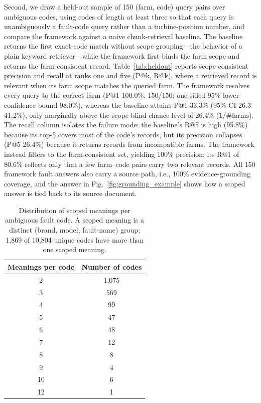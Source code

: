 \documentclass[lettersize,journal]{IEEEtran}
\begin{document}
Second, we draw a held-out sample of 150 (farm, code) query pairs over ambiguous codes, using codes of length at least three so that each query is unambiguously a fault-code query rather than a turbine-position number, and compare the framework against a naive chunk-retrieval baseline. The baseline returns the first exact-code match without scope grouping---the behavior of a plain keyword retriever---while the framework first binds the farm scope and returns the farm-consistent record. Table~\ref{tab:heldout} reports scope-consistent precision and recall at ranks one and five (P@k, R@k), where a retrieved record is relevant when its farm scope matches the queried farm. The framework resolves every query to the correct farm (P@1 100.0\%, 150/150; one-sided 95\% lower confidence bound 98.0\%), whereas the baseline attains P@1 33.3\% (95\% CI 26.3--41.2\%), only marginally above the scope-blind chance level of 26.4\% ($1/\#\mathrm{farms}$). The recall column isolates the failure mode: the baseline's R@5 is high (95.8\%) because its top-5 covers most of the code's records, but its precision collapses (P@5 26.4\%) because it returns records from incompatible farms. The framework instead filters to the farm-consistent set, yielding 100\% precision; its R@1 of 80.6\% reflects only that a few farm--code pairs carry two relevant records. All 150 framework fault answers also carry a source path, i.e., 100\% evidence-grounding coverage, and the answer in Fig.~\ref{fig:grounding_example} shows how a scoped answer is tied back to its source document.

\begin{table}[htbp]
\caption{Distribution of scoped meanings per ambiguous fault code. A scoped meaning is a distinct (brand, model, fault-name) group; 1{,}869 of 10{,}804 unique codes have more than one scoped meaning.}
\label{tab:ambiguity}
\centering
\small
\begin{tabular}{cc}
\toprule
Meanings per code & Number of codes \\
\midrule
2 & 1{,}075 \\
3 & 569 \\
4 & 99 \\
5 & 47 \\
6 & 48 \\
7 & 12 \\
8 & 8 \\
9 & 4 \\
10 & 6 \\
12 & 1 \\
\bottomrule
\end{tabular}
\end{table}
\end{document}
